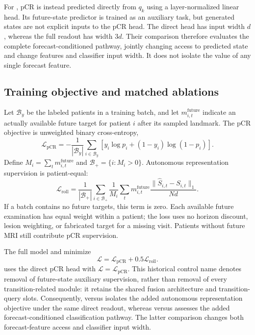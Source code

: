 For \direct{}, pCR is instead predicted directly from $q_k$ using a layer-normalized linear head. Its future-state predictor is trained as an auxiliary task, but generated states are not explicit inputs to the pCR head. The direct head has input width $d$, whereas the full readout has width $3d$. Their comparison therefore evaluates the complete forecast-conditioned pathway, jointly changing access to predicted state and change features and classifier input width. It does not isolate the value of any single forecast feature.

\subsection{Training objective and matched ablations}
\label{sec:objective}
Let $\mathcal{B}_{y}$ be the labeled patients in a training batch, and let $m_{i,t}^{\mathrm{future}}$ indicate an actually available future target for patient $i$ after its sampled landmark. The pCR objective is unweighted binary cross-entropy,
\begin{equation}
 \mathcal{L}_{\mathrm{pCR}}=
 -\frac{1}{|\mathcal{B}_{y}|}\sum_{i\in\mathcal{B}_{y}}
 \left[y_i\log p_i+(1-y_i)\log(1-p_i)\right].
\end{equation}
Define $M_i=\sum_t m_{i,t}^{\mathrm{future}}$ and $\mathcal{B}_{+}=\{i:M_i>0\}$. Autonomous representation supervision is patient-equal:
\begin{equation}
 \mathcal{L}_{\mathrm{roll}}=
 \frac{1}{|\mathcal{B}_{+}|}\sum_{i\in\mathcal{B}_{+}}
 \frac{1}{M_i}\sum_t m_{i,t}^{\mathrm{future}}
 \frac{\|\widehat S_{i,t}-S_{i,t}\|_1}{Nd}.
\end{equation}
If a batch contains no future targets, this term is zero. Each available future examination has equal weight within a patient; the loss uses no horizon discount, lesion weighting, or fabricated target for a missing visit. Patients without future MRI still contribute pCR supervision.

The full model and \direct{} minimize
\begin{equation}
 \mathcal{L}=\mathcal{L}_{\mathrm{pCR}}+0.5\mathcal{L}_{\mathrm{roll}}.
\end{equation}
\nojepa{} uses the direct pCR head with $\mathcal{L}=\mathcal{L}_{\mathrm{pCR}}$. This historical control name denotes removal of future-state auxiliary supervision, rather than removal of every transition-related module: it retains the shared fusion architecture and transition-query slots. Consequently, \direct{} versus \nojepa{} isolates the added autonomous representation objective under the same direct readout, whereas \fullmodel{} versus \direct{} assesses the added forecast-conditioned classification pathway. The latter comparison changes both forecast-feature access and classifier input width.

